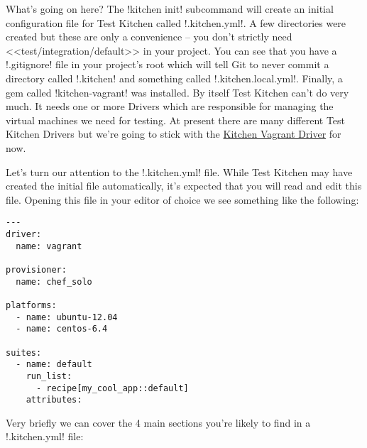 What's going on here? The \inline!kitchen init! subcommand will create an initial configuration file for Test Kitchen called \inline!.kitchen.yml!. A few directories were created but these are only a convenience – you don't strictly need <<test/integration/default>> in your project. You can see that you have a \inline!.gitignore! file in your project's root which will tell Git to never commit a directory called \inline!.kitchen! and something called \inline!.kitchen.local.yml!. Finally, a gem called \inline!kitchen-vagrant! was installed. By itself Test Kitchen can't do very much. It needs one or more Drivers which are responsible for managing the virtual machines we need for testing. At present there are many different Test Kitchen Drivers but we're going to stick with the \href{https://github.com/opscode/kitchen-vagrant}{Kitchen Vagrant Driver} for now.

Let's turn our attention to the \inline!.kitchen.yml! file. While Test Kitchen may have created the initial file automatically, it's expected that you will read and edit this file. Opening this file in your editor of choice we see something like the following:

\begin{lstlisting}[label=lst:testing-test-kitchen4]
---
driver:
  name: vagrant

provisioner:
  name: chef_solo

platforms:
  - name: ubuntu-12.04
  - name: centos-6.4

suites:
  - name: default
    run_list:
      - recipe[my_cool_app::default]
    attributes:
\end{lstlisting}

Very briefly we can cover the 4 main sections you're likely to find in a \inline!.kitchen.yml! file:

